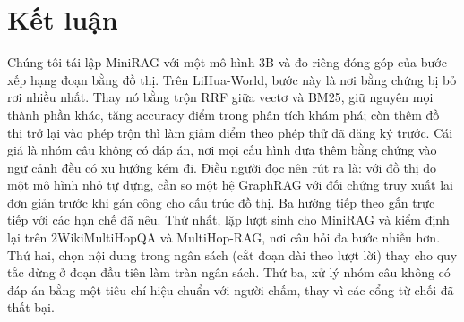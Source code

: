 \section{Kết luận}\label{sec:conclusion}
Chúng tôi tái lập MiniRAG với một mô hình 3B và đo riêng đóng góp của bước xếp hạng đoạn bằng đồ thị.
Trên LiHua-World, bước này là nơi bằng chứng bị bỏ rơi nhiều nhất. Thay nó bằng trộn RRF giữa vectơ và BM25, giữ nguyên mọi thành phần khác, tăng accuracy \diffXC{} điểm trong phân tích khám phá; còn thêm đồ thị trở lại vào phép trộn thì làm giảm \diffHC{} điểm theo phép thử đã đăng ký trước.
Cái giá là nhóm câu không có đáp án, nơi mọi cấu hình đưa thêm bằng chứng vào ngữ cảnh đều có xu hướng kém đi.
Điều người đọc nên rút ra là: với đồ thị do một mô hình nhỏ tự dựng, cần so một hệ GraphRAG với đối chứng truy xuất lai đơn giản trước khi gán công cho cấu trúc đồ thị.
Ba hướng tiếp theo gắn trực tiếp với các hạn chế đã nêu.
Thứ nhất, lặp lượt sinh cho MiniRAG và kiểm định lại trên 2WikiMultiHopQA và MultiHop-RAG, nơi câu hỏi đa bước nhiều hơn.
Thứ hai, chọn nội dung trong ngân sách (cắt đoạn dài theo lượt lời) thay cho quy tắc dừng ở đoạn đầu tiên làm tràn ngân sách.
Thứ ba, xử lý nhóm câu không có đáp án bằng một tiêu chí hiệu chuẩn với người chấm, thay vì các cổng từ chối đã thất bại.
